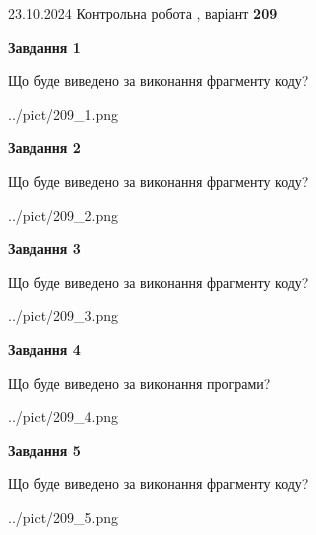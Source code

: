 \documentclass[12pt, ukrainian]{article}
\begin{document}
{\Large{23.10.2024 Контрольна робота , варіант  \No \textbf { 209 }\par}}
{
\begin {large}
{\begin {center}\textbf{Завдання 1}\end {center}}

Що буде виведено за виконання фрагменту коду?\par
\begin{center}
	{../pict/209_1.png}
\end{center}
\newpage

{\begin {center}\textbf{Завдання 2}\end {center}}

Що буде виведено за виконання фрагменту коду?\par
\begin{center}
	{../pict/209_2.png}
\end{center}
\newpage

{\begin {center}\textbf{Завдання 3}\end {center}}

Що буде виведено за виконання фрагменту коду?\par
\begin{center}
	{../pict/209_3.png}
\end{center}
\newpage

{\begin {center}\textbf{Завдання 4}\end {center}}

Що буде виведено за виконання програми?\par
\begin{center}
	{../pict/209_4.png}
\end{center}
\newpage

{\begin {center}\textbf{Завдання 5}\end {center}}

Що буде виведено за виконання фрагменту коду?\par
\begin{center}
	{../pict/209_5.png}
\end{center}
\newpage


\end{large}}
\end{document}
